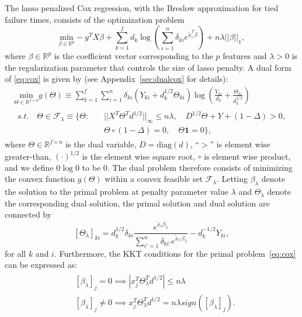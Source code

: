 The lasso penalized Cox regression, with the Breslow approximation \citep{breslow1974covariance} for tied failure times, consists of the optimization problem
\begin{equation}
    \label{eq:cox}
    \underset{\beta\in \mathbb{R}^p}{\mathrm{min}}-y^TX\beta+\sum_{k=1}^f d_k\log\left(\sum_{i=1}^n \delta_{ki} e^{\tilde{x}_i^T\beta}\right)+n\lambda||\beta||_1,
\end{equation}
where $\beta\in\mathbb{R}^p$ is the coefficient vector corresponding to the $p$ features and $\lambda>0$ is the regularization parameter that controls the size of lasso penalty. A dual form of \eqref{eq:cox} is given by (see Appendix~\ref{sec:dualcox} for details):
\begin{gather}
        \label{eq:dualTheta}
        \underset{\Theta\in \mathbb{R}^{f\times n}}{\mathrm{min}}g(\Theta)\equiv\sum_{k=1}^f\sum_{i=1}^n\delta_{ki}(Y_{ki}+d_k^{1/2}\Theta_{ki})\log\left(\frac{Y_{ki}}{d_k}+\frac{\Theta_{ki}}{d_k^{1/2}}\right)\\
        \begin{aligned}s.t.\quad \Theta\in \mathcal{F}_\lambda\equiv\{\Theta:\quad
            &||X^T\Theta^Td^{1/2}||_\infty\leq n\lambda,\quad D^{1/2}\Theta+Y+(1-\Delta)> 0,\\& \Theta\circ(1-\Delta)=0,\quad \Theta\mathbf{1}=0\}\nonumber,
        \end{aligned}
\end{gather}
where $\Theta\in \mathbb{R}^{f\times n}$ is the dual variable, $D=\textrm{diag}(d)$, ``$>$'' is element wise greater-than, $(\cdot)^{1/2}$ is the element wise square root, $\circ$ is element wise product, and we define $0\log 0$ to be 0. The dual problem therefore consists of minimizing the convex function $g(\Theta)$ within a convex feasible set $\mathcal{F}_\lambda$. Letting $\beta_\lambda$ denote the solution to the primal problem at penalty parameter value $\lambda$ and $\Theta_{\lambda}$ denote the corresponding dual solution, the primal solution and dual solution are connected by
\begin{equation}
    \label{eq:dualprimalcox}
    [\Theta_\lambda]_{ki}=d_k^{1/2}\delta_{ki}\frac{e^{\tilde{x}_i\beta_\lambda}}{\sum_{i'=1}^n\delta_{ki'}e^{\tilde{x}_{i'}\beta_\lambda}}-d_k^{-1/2}Y_{ki},
\end{equation}
for all $k$ and $i$. Furthermore, the KKT conditions for the primal problem~\eqref{eq:cox} can be expressed as:
\begin{gather}
    \label{eq:kktcox}
    \begin{aligned}&[\beta_\lambda]_{j}=0\implies\left|x_j^T\Theta_\lambda^Td^{1/2}\right|\leq n\lambda\\
    & [\beta_\lambda]_{j}\neq0\implies x_j^T\Theta_\lambda^Td^{1/2}= n\lambda\textit{sign}([\beta_\lambda]_{j}).
    \end{aligned}
\end{gather}
